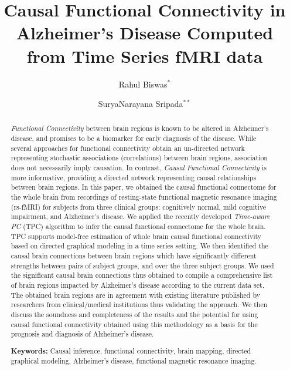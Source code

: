 \documentclass[12pt,reqno]{amsart}
\title[Causal Functional Connectivity in Alzheimer's Disease]{Causal Functional Connectivity in Alzheimer's Disease Computed from Time Series fMRI data}
\author[Biswas]{Rahul Biswas$^\ast$}
\author[Sripada]{SuryaNarayana Sripada$^{\ast\ast}$}
\theoremstyle{definition}
\begin{document}
\maketitle

\begin{abstract}
\emph{Functional Connectivity} between brain regions is known to be altered in Alzheimer's disease, and promises to be a biomarker for early diagnosis of the disease. While several approaches for functional connectivity obtain an un-directed network representing stochastic associations (correlations) between brain regions, association does not necessarily imply causation. In contrast, \emph{Causal Functional Connectivity} is more informative, providing a directed network representing causal relationships between brain regions. In this paper, we obtained the causal functional connectome for the whole brain from recordings of resting-state functional magnetic resonance imaging (rs-fMRI) for subjects from three clinical groups: cognitively normal, mild cognitive impairment, and Alzheimer's disease. We applied the recently developed \emph{Time-aware PC} (TPC) algorithm to infer the causal functional connectome for the whole brain. TPC supports model-free estimation of whole brain causal functional connectivity based on directed graphical modeling in a time series setting. We then identified the causal brain connections between brain regions which have significantly different strengths between pairs of subject groups, and over the three subject groups. We used the significant causal brain connections thus obtained to compile a comprehensive list of brain regions impacted by Alzheimer's disease according to the current data set. The obtained brain regions are in agreement with existing literature published by researchers from clinical/medical institutions thus validating the approach. We then discuss the soundness and completeness of the results and the potential for using  causal functional connectivity obtained using this methodology as a basis for the prognosis and diagnosis of Alzheimer's disease.

\smallskip
\noindent \textbf{Keywords:} Causal inference, functional connectivity, brain mapping, directed graphical modeling, Alzheimer's disease, functional magnetic resonance imaging. 
\end{abstract}
\end{document}

